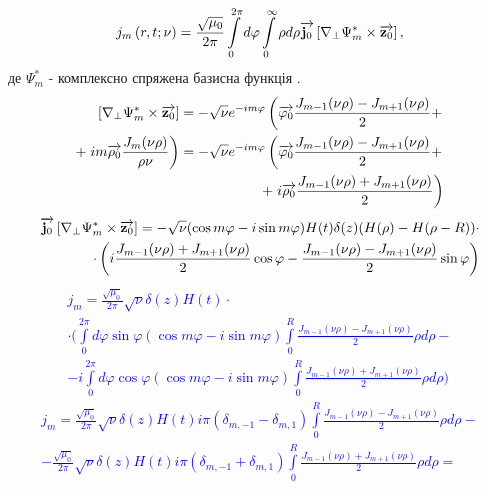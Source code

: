 \begin{equation} \label{eq:jm_base}
j_m \left( r, t; \nu \right) = \frac{\sqrt{\mu_0}}{2\pi} 
\int \limits_{0}^{2\pi} d \varphi \int \limits_{0}^{\infty} \rho d \rho 
\overrightarrow{\mathbf j_0} \left[  \nabla_\perp \Psi_m^*  \times  \overrightarrow{\mathbf z_0}  \right],
\end{equation}
%
де $ \Psi_m^* $ - комплексно спряжена базисна функція \cite{imp:Dumin2010}.
%
\textcolor{blue} { \begin{equation*} \begin{aligned}
\left[  \nabla_\perp \Psi_m^*  \times  \overrightarrow{\mathbf z_0}  \right] = 
- \sqrt{\nu} e^{-im\varphi} \left( 
\overrightarrow{\mathbf \varphi_0} \frac{J_{m-1} (\nu \rho) - J_{m+1} (\nu \rho)}{2} + 
\right. \\ + \left. i m \overrightarrow{\mathbf \rho_0} \frac{J_m (\nu \rho)}
{\rho \nu} \right) = - \sqrt{\nu} e^{-im\varphi} \left( 
\overrightarrow{\mathbf \varphi_0} \frac{J_{m-1} (\nu \rho) - J_{m+1} (\nu \rho)}{2} + 
\right. \\ + \left. i \overrightarrow{\mathbf \rho_0} \frac{J_{m-1} (\nu \rho) + 
J_{m+1} (\nu \rho)}{2} \right)
\end{aligned} \end{equation*} }
%
\textcolor{blue} { \begin{equation*} \begin{aligned}
\overrightarrow{\mathbf j_0} \left[  \nabla_\perp \Psi_m^*  \times  \overrightarrow{\mathbf z_0}  \right] = 
- \sqrt{\nu} ( \cos m \varphi - i \sin m \varphi ) 
H(t) \delta(z) ( H(\rho) - H(\rho - R) ) \cdot \\ \cdot \left( 
i \frac{J_{m-1} (\nu \rho) + J_{m+1} (\nu \rho)}{2} \cos \varphi
- \frac{J_{m-1} (\nu \rho) - J_{m+1} (\nu \rho)}{2} \sin \varphi
\right)
\end{aligned} \end{equation*} }
%
\textcolor{blue} { \begin{equation*} \begin{aligned}
j_m = \frac{\sqrt{\mu_0}}{2\pi} \sqrt{\nu} \delta(z) H(t) \cdot \\
\cdot \Big( \int \limits_{0}^{2\pi} d \varphi \sin \varphi 
( \cos m \varphi - i \sin m \varphi) \int \limits_{0}^{R} 
\frac{J_{m-1} (\nu \rho) - J_{m+1} (\nu \rho)}{2} \rho d \rho - \\
- i \int \limits_{0}^{2\pi} d \varphi \cos \varphi 
( \cos m \varphi - i \sin m \varphi) \int \limits_{0}^{R} 
\frac{J_{m-1} (\nu \rho) + J_{m+1} (\nu \rho)}{2} \rho d \rho \Big)
\end{aligned} \end{equation*} }
%
\textcolor{blue} { \begin{equation*} \begin{aligned}
j_m = \frac{\sqrt{\mu_0}}{2\pi} \sqrt{\nu} \delta(z) H(t) 
i\pi ( \delta_{m,-1} - \delta_{m,1} ) \int \limits_{0}^{R} 
\frac{J_{m-1} (\nu \rho) - J_{m+1} (\nu \rho)}{2} \rho d \rho - \\
- \frac{\sqrt{\mu_0}}{2\pi} \sqrt{\nu} \delta(z) H(t) 
i\pi ( \delta_{m,-1} + \delta_{m,1} ) \int \limits_{0}^{R} 
\frac{J_{m-1} (\nu \rho) + J_{m+1} (\nu \rho)}{2} \rho d \rho =
\end{aligned} \end{equation*} }
